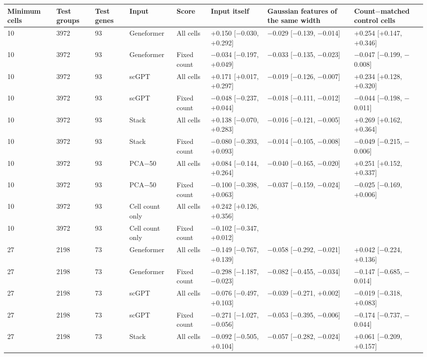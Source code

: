 \begin{tabular}{llllllll}
\toprule
Minimum cells & Test groups & Test genes & Input & Score & Input itself & Gaussian features of the same width & Count$-$matched control cells \\
\midrule
10 & 3972 & 93 & Geneformer & All cells & +0.150 [$-$0.030, +0.292] & $-$0.029 [$-$0.139, $-$0.014] & +0.254 [+0.147, +0.346] \\
10 & 3972 & 93 & Geneformer & Fixed count & $-$0.034 [$-$0.197, +0.049] & $-$0.033 [$-$0.135, $-$0.023] & $-$0.047 [$-$0.199, $-$0.008] \\
10 & 3972 & 93 & scGPT & All cells & +0.171 [+0.017, +0.297] & $-$0.019 [$-$0.126, $-$0.007] & +0.234 [+0.128, +0.320] \\
10 & 3972 & 93 & scGPT & Fixed count & $-$0.048 [$-$0.237, +0.044] & $-$0.018 [$-$0.111, $-$0.012] & $-$0.044 [$-$0.198, $-$0.011] \\
10 & 3972 & 93 & Stack & All cells & +0.138 [$-$0.070, +0.283] & $-$0.016 [$-$0.121, $-$0.005] & +0.269 [+0.162, +0.364] \\
10 & 3972 & 93 & Stack & Fixed count & $-$0.080 [$-$0.393, +0.093] & $-$0.014 [$-$0.105, $-$0.008] & $-$0.049 [$-$0.215, $-$0.006] \\
10 & 3972 & 93 & PCA$-$50 & All cells & +0.084 [$-$0.144, +0.264] & $-$0.040 [$-$0.165, $-$0.020] & +0.251 [+0.152, +0.337] \\
10 & 3972 & 93 & PCA$-$50 & Fixed count & $-$0.100 [$-$0.398, +0.063] & $-$0.037 [$-$0.159, $-$0.024] & $-$0.025 [$-$0.169, +0.006] \\
10 & 3972 & 93 & Cell count only & All cells & +0.242 [+0.126, +0.356] &  &  \\
10 & 3972 & 93 & Cell count only & Fixed count & $-$0.102 [$-$0.347, +0.012] &  &  \\
27 & 2198 & 73 & Geneformer & All cells & $-$0.149 [$-$0.767, +0.139] & $-$0.058 [$-$0.292, $-$0.021] & +0.042 [$-$0.224, +0.136] \\
27 & 2198 & 73 & Geneformer & Fixed count & $-$0.298 [$-$1.187, $-$0.023] & $-$0.082 [$-$0.455, $-$0.034] & $-$0.147 [$-$0.685, $-$0.014] \\
27 & 2198 & 73 & scGPT & All cells & $-$0.076 [$-$0.497, +0.103] & $-$0.039 [$-$0.271, +0.002] & $-$0.019 [$-$0.318, +0.083] \\
27 & 2198 & 73 & scGPT & Fixed count & $-$0.271 [$-$1.027, $-$0.056] & $-$0.053 [$-$0.395, $-$0.006] & $-$0.174 [$-$0.737, $-$0.044] \\
27 & 2198 & 73 & Stack & All cells & $-$0.092 [$-$0.505, +0.104] & $-$0.057 [$-$0.282, $-$0.024] & +0.061 [$-$0.209, +0.157] \\

\end{tabular}
